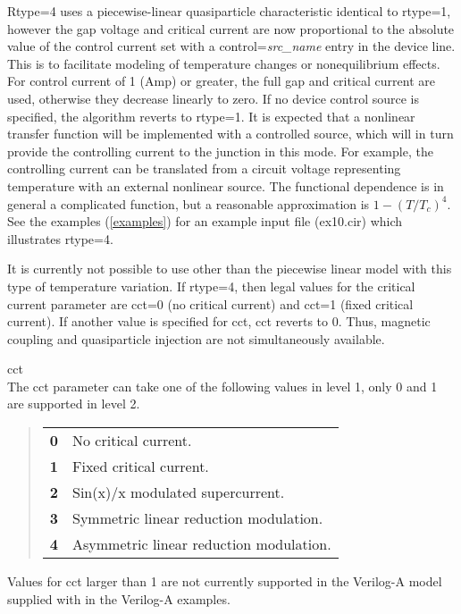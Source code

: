 \begin{description}
{\vt Rtype=4} uses a piecewise-linear quasiparticle characteristic
identical to {\vt rtype=1}, however the gap voltage and critical
current are now proportional to the absolute value of the control
current set with a {\vt control=}{\it src\_name} entry in the device
line.  This is to facilitate modeling of temperature changes or
nonequilibrium effects.  For control current of 1 (Amp) or greater,
the full gap and critical current are used, otherwise they decrease
linearly to zero.  If no device control source is specified, the
algorithm reverts to {\vt rtype=1}.  It is expected that a nonlinear
transfer function will be implemented with a controlled source, which
will in turn provide the controlling current to the junction in this
mode.  For example, the controlling current can be translated from a
circuit voltage representing temperature with an external nonlinear
source.  The functional dependence is in general a complicated
function, but a reasonable approximation is $1 - (T/T_c)^4$.  See the
examples (\ref{examples}) for an example input file ({\vt ex10.cir})
which illustrates {\vt rtype=4}.

It is currently not possible to use other than the piecewise linear
model with this type of temperature variation.  If {\vt rtype=4}, then
legal values for the critical current parameter are {\vt cct=0} (no
critical current) and {\vt cct=1} (fixed critical current).  If
another value is specified for {\vt cct}, {\vt cct} reverts to 0. 
Thus, magnetic coupling and quasiparticle injection are not
simultaneously available.

\item{\vt cct}\\
The {\vt cct} parameter can take one of the following values in level
1, only 0 and 1 are supported in level 2.
\begin{quote}
\begin{tabular}{ll}
\bf 0 & No critical current.\\
\bf 1 & Fixed critical current.\\
\bf 2 & Sin(x)/x modulated supercurrent.\\
\bf 3 & Symmetric linear reduction modulation.\\
\bf 4 & Asymmetric linear reduction modulation.\\
\end{tabular}
\end{quote}

Values for {\vt cct} larger than 1 are not currently supported in the
Verilog-A model supplied with {\WRspice} in the Verilog-A examples.


\end{description}
